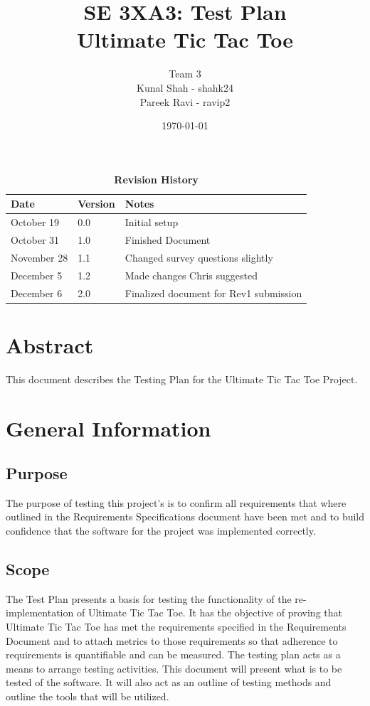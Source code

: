 \documentclass[12pt, titlepage]{article}
\title{SE 3XA3: Test Plan\\Ultimate Tic Tac Toe}
\author{Team 3
		\\ Kunal Shah - shahk24
		\\ Pareek Ravi - ravip2
}
\date{\today}
\begin{document}
\maketitle

\tableofcontents
\listoftables
\listoffigures

\newpage
\begin{table}[hp]
\caption{\bf Revision History}
\begin{tabularx}{\textwidth}{p{3cm}p{2cm}X}
\toprule {\bf Date} & {\bf Version} & {\bf Notes}\\
\midrule
October 19 & 0.0 & Initial setup\\
October 31 & 1.0 & Finished Document \\
November 28 & 1.1 & Changed survey questions slightly\\
December 5 & 1.2 & Made changes Chris suggested\\
December 6 & 2.0 & Finalized document for Rev1 submission\\
\bottomrule
\end{tabularx}
\end{table}

\newpage


\section*{Abstract} 
This document describes the Testing Plan for the Ultimate Tic Tac Toe Project.

\section{General Information}

\subsection{Purpose}
The purpose of testing this project's is to confirm all requirements that where
outlined in the Requirements Specifications document have been met and to build
confidence that the software for the project was implemented correctly.

\subsection{Scope}
The Test Plan presents a basis for testing the functionality of the re-
implementation of Ultimate Tic Tac Toe. It has the objective of proving that
Ultimate Tic Tac Toe has met the requirements specified in the Requirements
Document and to attach metrics to those requirements so that adherence to
requirements is quantifiable and can be measured. The testing plan acts as a
means to arrange testing activities. This document will present what is to be
tested of the software. It will also act as an outline of testing methods and
outline the tools that will be utilized.
\end{document}

